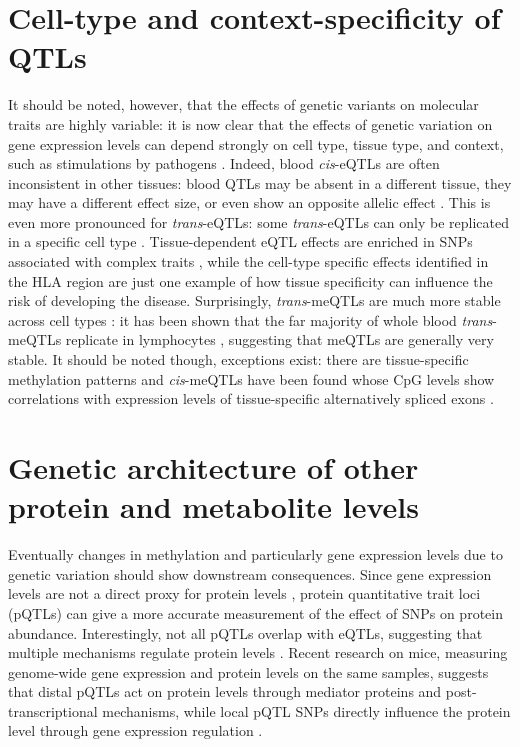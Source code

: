 \section{Cell-type and context-specificity of QTLs}
It should be noted, however, that the effects of genetic variants on molecular traits are highly variable: it is now clear that the effects of genetic variation on gene expression levels can depend strongly on cell type, tissue type, and context, such as stimulations by pathogens \cite{fuUnravelingRegulatoryMechanisms2012,gat-viksDecipheringMolecularCircuits2013,fairfaxInnateImmuneActivity2014,leeCommonGeneticVariants2014,meleHumanTranscriptomeTissues2015}. Indeed, blood \textit{cis}-eQTLs are often inconsistent in other tissues: blood QTLs may be absent in a different tissue, they may have a different effect size, or even show an opposite allelic effect \cite{fuUnravelingRegulatoryMechanisms2012}. This is even more pronounced for \textit{trans}-eQTLs: some \textit{trans}-eQTLs can only be replicated in a specific cell type \cite{westraSystematicIdentificationTrans2013}. Tissue-dependent eQTL effects are enriched in SNPs associated with complex traits \cite{fuUnravelingRegulatoryMechanisms2012}, while the cell-type specific effects identified in the HLA region \cite{fairfaxGeneticsGeneExpression2012} are just one example of how tissue specificity can influence the risk of developing the disease. Surprisingly, \textit{trans}-meQTLs are much more stable across cell types \cite{gutierrez-arcelusTissueSpecificEffectsGenetic2015}: it has been shown that the far majority of whole blood \textit{trans}-meQTLs replicate in lymphocytes \cite{bonderDiseaseVariantsAlter2017}, suggesting that meQTLs are generally very stable. It should be noted though, exceptions exist: there are tissue-specific methylation patterns \cite{lokkDNAMethylomeProfiling2014} and \textit{cis}-meQTLs have been found whose CpG levels show correlations with expression levels of tissue-specific alternatively spliced exons \cite{gutierrez-arcelusTissueSpecificEffectsGenetic2015}.

\section{Genetic architecture of other protein and metabolite levels}
Eventually changes in methylation and particularly gene expression levels due to genetic variation should show downstream consequences. Since gene expression levels are not a direct proxy for protein levels \cite{partsHeritabilityGeneticBasis2014,liuInterdependenceTranscriptProtein2016}, protein quantitative trait loci (pQTLs) can give a more accurate measurement of the effect of SNPs on protein abundance. Interestingly, not all pQTLs overlap with eQTLs, suggesting that multiple mechanisms regulate protein levels \cite{wuVariationGeneticControl2013,liuQuantitativeVariability3422015}. Recent research on mice, measuring genome-wide gene expression and protein levels on the same samples, suggests that distal pQTLs act on protein levels through mediator proteins and post-transcriptional mechanisms, while local pQTL SNPs directly influence the protein level through gene expression regulation \cite{chickDefiningConsequencesGenetic2016}. 

